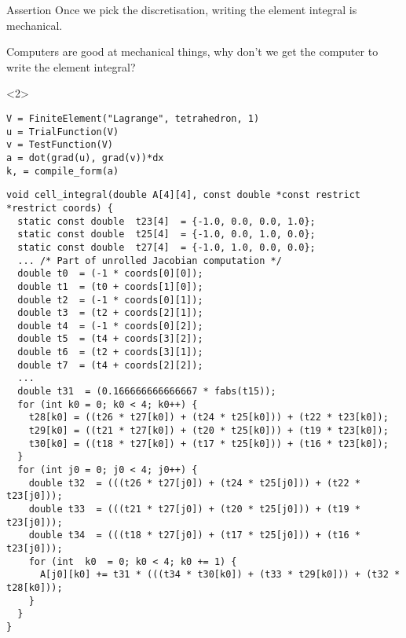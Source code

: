 \documentclass[presentation]{beamer}
\begin{document}
\begin{frame}[fragile]
  \begin{block}{Assertion}
    Once we pick the discretisation, writing the element integral is mechanical.
  \end{block}
  \begin{corollary}
    Computers are good at mechanical things, why don't we get the
    computer to write the element integral?
  \end{corollary}
  \begin{uncoverenv}<2>
    \begin{center}
\begin{verbatim}
V = FiniteElement("Lagrange", tetrahedron, 1)
u = TrialFunction(V)
v = TestFunction(V)
a = dot(grad(u), grad(v))*dx
k, = compile_form(a)
\end{verbatim}
    \end{center}
  \end{uncoverenv}
\end{frame}

\begin{frame}[fragile]
\begin{verbatim}
void cell_integral(double A[4][4], const double *const restrict *restrict coords) {
  static const double  t23[4]  = {-1.0, 0.0, 0.0, 1.0};
  static const double  t25[4]  = {-1.0, 0.0, 1.0, 0.0};
  static const double  t27[4]  = {-1.0, 1.0, 0.0, 0.0};
  ... /* Part of unrolled Jacobian computation */
  double t0  = (-1 * coords[0][0]);
  double t1  = (t0 + coords[1][0]);
  double t2  = (-1 * coords[0][1]);
  double t3  = (t2 + coords[2][1]);
  double t4  = (-1 * coords[0][2]);
  double t5  = (t4 + coords[3][2]);
  double t6  = (t2 + coords[3][1]);
  double t7  = (t4 + coords[2][2]);
  ...
  double t31  = (0.166666666666667 * fabs(t15));
  for (int k0 = 0; k0 < 4; k0++) {
    t28[k0] = ((t26 * t27[k0]) + (t24 * t25[k0])) + (t22 * t23[k0]);
    t29[k0] = ((t21 * t27[k0]) + (t20 * t25[k0])) + (t19 * t23[k0]);
    t30[k0] = ((t18 * t27[k0]) + (t17 * t25[k0])) + (t16 * t23[k0]);
  }
  for (int j0 = 0; j0 < 4; j0++) {
    double t32  = (((t26 * t27[j0]) + (t24 * t25[j0])) + (t22 * t23[j0]));
    double t33  = (((t21 * t27[j0]) + (t20 * t25[j0])) + (t19 * t23[j0]));
    double t34  = (((t18 * t27[j0]) + (t17 * t25[j0])) + (t16 * t23[j0]));
    for (int  k0  = 0; k0 < 4; k0 += 1) {
      A[j0][k0] += t31 * (((t34 * t30[k0]) + (t33 * t29[k0])) + (t32 * t28[k0]));
    }
  }
}
\end{verbatim}
\end{frame}
\end{document}

